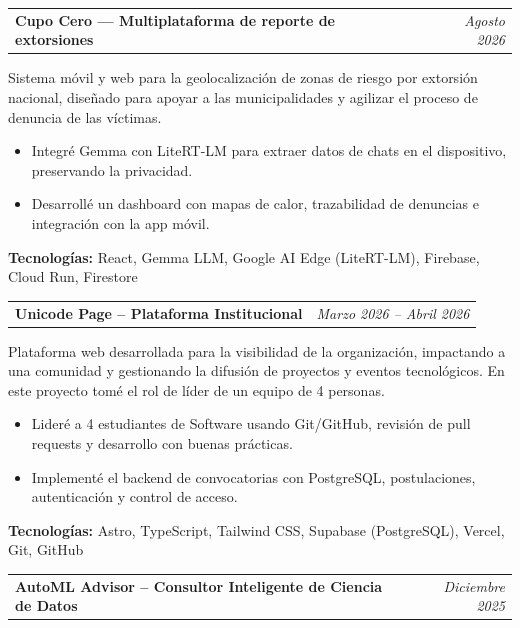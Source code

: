 \documentclass[a4paper,11pt]{article}
\begin{document}
\noindent
\begin{tabularx}{\textwidth}{@{}X r@{}}
\textbf{Cupo Cero — Multiplataforma de reporte de extorsiones} & \textit{\small Agosto 2026}
\end{tabularx}
\small
Sistema móvil y web para la geolocalización de zonas de riesgo por extorsión nacional, diseñado para apoyar a las municipalidades y agilizar el proceso de denuncia de las víctimas.

\begin{itemize}[leftmargin=1.5em, nosep]
\item Integré Gemma con LiteRT-LM para extraer datos de chats en el dispositivo, preservando la privacidad.
\item Desarrollé un dashboard con mapas de calor, trazabilidad de denuncias e integración con la app móvil.

\end{itemize}

\textbf {Tecnologías:} React, Gemma LLM, Google AI Edge (LiteRT-LM), Firebase, Cloud Run, Firestore

\vspace{5mm}

\noindent
\begin{tabularx}{\textwidth}{@{}X r@{}}
\textbf{Unicode Page -- Plataforma Institucional} & \textit{\small Marzo 2026 -- Abril 2026}
\end{tabularx}

\small
Plataforma web desarrollada para la visibilidad de la organización, impactando a una comunidad y gestionando la difusión de proyectos y eventos tecnológicos. En este proyecto tomé el rol de líder de un equipo de 4 personas.

\begin{itemize}[leftmargin=1.5em, nosep]
\item Lideré a 4 estudiantes de Software usando Git/GitHub, revisión de pull requests y desarrollo con buenas prácticas.
\item Implementé el backend de convocatorias con PostgreSQL, postulaciones, autenticación y control de acceso.
\end{itemize}

\textbf{Tecnologías:} Astro, TypeScript, Tailwind CSS, Supabase (PostgreSQL), Vercel, Git, GitHub

\vspace{5mm}
\noindent
\begin{tabularx}{\textwidth}{@{}X r@{}}
\textbf{AutoML Advisor – Consultor Inteligente de Ciencia de Datos} & \textit{\small Diciembre 2025}
\end{tabularx}
\end{document}
